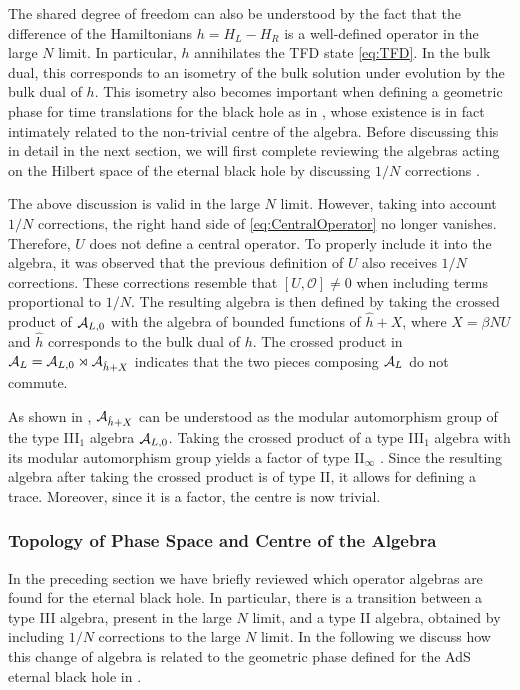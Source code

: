 \documentclass[a4paper,11pt]{article}
\newcommand{\1}{\mathds{1}}
\begin{document}
The shared degree of freedom can also be understood by the fact that the difference of the Hamiltonians $h=H_L-H_R$ is a well-defined operator in the large $N$ limit. In particular, $h$ annihilates the TFD state \eqref{eq:TFD}. In the bulk dual, this corresponds to an isometry of the bulk solution under evolution by the bulk dual of $h$. This isometry also becomes important when defining a geometric phase for time translations for the black hole as in \cite{Nogueira:2021ngh}, whose existence is in fact intimately related to the non-trivial centre of the algebra. Before discussing this in detail in the next section, we will first complete reviewing the algebras acting on the Hilbert space of the eternal black hole by discussing $1/N$ corrections \cite{Witten:2021unn}.

The above discussion is valid in the large $N$ limit. However, taking into account $1/N$ corrections, the right hand side of \eqref{eq:CentralOperator} no longer vanishes. Therefore, $U$ does not define a central operator. To properly include it into the algebra, it was observed that the previous definition of $U$ also receives $1/N$ corrections. These corrections resemble that $[U,\mathcal{O}]\neq0$ when including terms proportional to $1/N$. The resulting algebra is then defined by taking the crossed product of ${\cal A}_{L,0}$ with the algebra of bounded functions of $\hat{h}+X$, where $X=\beta NU$ and $\hat{h}$ corresponds to the bulk dual of $h$. The crossed product in ${\cal A}_L={\cal A}_{L,0}\rtimes{\cal A}_{\hat{h}+X}$ indicates that the two pieces composing ${\cal A}_L$ do not commute.

As shown in \cite{Witten:2021unn}, ${\cal A}_{\hat{h}+X}$ can be understood as the modular automorphism group of the type III$_1$ algebra ${\cal A}_{L,0}$. Taking the crossed product of a type III$_1$ algebra with its modular automorphism group yields a factor of type II$_\infty$ \cite{Takesaki:1973duality,Connes:1973classification,Connes:1994yd}. Since the resulting algebra after taking the crossed product is of type II, it allows for defining a trace. Moreover, since it is a factor, the centre is now trivial.

\subsubsection{Topology of Phase Space and Centre of the Algebra}
\label{sec:TopPhaseSpaceCentre}

In the preceding section we have briefly reviewed which operator algebras are found for the eternal black hole. In particular, there is a transition between a type III algebra, present in the large $N$ limit, and a type II algebra, obtained by including $1/N$ corrections to the large $N$ limit. In the following we discuss how this change of algebra is related to the geometric phase defined for the AdS eternal black hole in \cite{Nogueira:2021ngh}.
\end{document}

